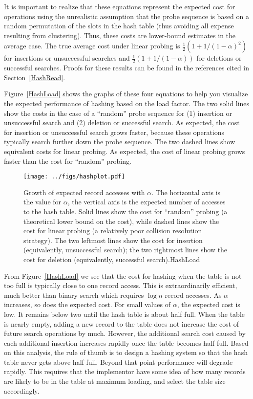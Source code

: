 It is important to realize that these equations represent the expected
cost for operations using the unrealistic assumption that the
probe sequence is based on a random
permutation of the slots in the hash
table (thus avoiding all expense resulting from clustering).
Thus, these costs are lower-bound estimates in the
average case.
The true average cost under linear
probing is \( \frac{1}{2}(1 + 1/(1-\alpha)^2) \) for
insertions or unsuccessful searches and
\( \frac{1}{2}(1 + 1/(1-\alpha)) \) for deletions or successful
searches.
Proofs for these results can be found in the references cited in
Section~\ref{HashRead}.

Figure~\ref{HashLoad} shows the graphs of these four equations to help
you visualize the expected performance of hashing based on the load
factor.
The two solid lines show the costs in the case of a ``random''
probe sequence for (1) insertion or unsuccessful search and (2)
deletion or successful search.
As expected, the cost for insertion or unsuccessful search grows
faster, because these operations typically search further down the
probe sequence.
The two dashed lines show equivalent costs for linear probing.
As expected, the cost of linear probing grows faster than the cost for
``random'' probing.

\begin{figure}
\texttt{[image: ../figs/hashplot.pdf]}

\smallskip
{}
{Growth of expected record accesses with \(\alpha\).
The horizontal axis is the value for \(\alpha\), the vertical axis
is the expected number of accesses to the hash table.
Solid lines show the cost for ``random'' probing (a theoretical lower
bound on the cost), while dashed lines
show the cost for linear probing (a relatively poor collision
resolution strategy).
The two leftmost lines show the cost for insertion
(equivalently, unsuccessful search);
the two rightmost lines show the cost for deletion
(equivalently, successful search).}{HashLoad}
\bigskip
\end{figure}

From Figure~\ref{HashLoad} we see that the cost for
hashing when the table is not too full is typically close to one
record access.
This is extraordinarily efficient, much better than
binary search which requires \(\log n\) record accesses.
As \(\alpha\) increases, so does the expected cost.
For small values of \(\alpha\), the expected cost is low.
It remains below two until the hash table is about half full.
When the table is nearly empty, adding a new record to the table
does not increase the cost of future search operations by much.
However, the additional search cost caused by each additional
insertion increases rapidly once the table becomes half full.
Based on this analysis, the rule of thumb is to design a hashing
system so that the hash table never gets above half full.
Beyond that point performance will degrade rapidly.
This requires that the implementor have some idea of how many records
are likely to be in the table at maximum loading, and select the
table size accordingly.

